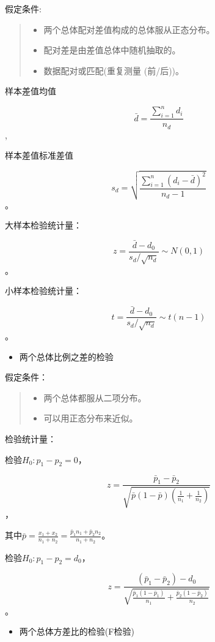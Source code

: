 \documentclass[]{ctexbook}
\providecommand{\tightlist}{%
  \setlength{\itemsep}{0pt}\setlength{\parskip}{0pt}}
\begin{document}
假定条件:

\begin{quote}
\begin{itemize}
\tightlist
\item
  两个总体配对差值构成的总体服从正态分布。
\item
  配对差是由差值总体中随机抽取的。
\item
  数据配对或匹配(重复测量 (前/后))。
\end{itemize}
\end{quote}

样本差值均值

\[\bar d=\frac{\sum_{i=1}^n d_i}{n_d}\],

样本差值标准差值

\[s_d=\sqrt{\frac{\sum_{i=1}^n(d_i-\bar d)^2}{n_d-1}}\]。

大样本检验统计量：

\[z=\frac{\bar d-d_0}{s_d/\sqrt{n_d}}\sim N(0,1)\]。

小样本检验统计量：

\[t=\frac{\bar d-d_0}{s_d/\sqrt{n_d}}\sim t(n-1)\]。

\begin{itemize}
\tightlist
\item
  两个总体比例之差的检验
\end{itemize}

假定条件：

\begin{quote}
\begin{itemize}
\tightlist
\item
  两个总体都服从二项分布。
\item
  可以用正态分布来近似。
\end{itemize}
\end{quote}

检验统计量：

检验\(H_0:p_1-p_2=0\)，

\[z=\frac{\bar p_1-\bar p_2}{\sqrt{\bar p(1-\bar p)(\frac{1}{n_1}+\frac{1}{n_2})}}\]，

其中\(\bar p=\frac{x_1+x_2}{n_1+n_2}=\frac{\bar p_1n_1+\bar p_2n_2}{n_1+n_2}\)。

检验\(H_0:p_1-p_2=d_0\)，

\[z=\frac{(\bar p_1-\bar p_2)-d_0}{\sqrt{\frac{\bar p_1(1-\bar p_1)}{n_1}+\frac{\bar p_2(1-\bar p_2)}{n_2}}}\]。

\begin{itemize}
\tightlist
\item
  两个总体方差比的检验(F检验)
\end{itemize}
\end{document}
